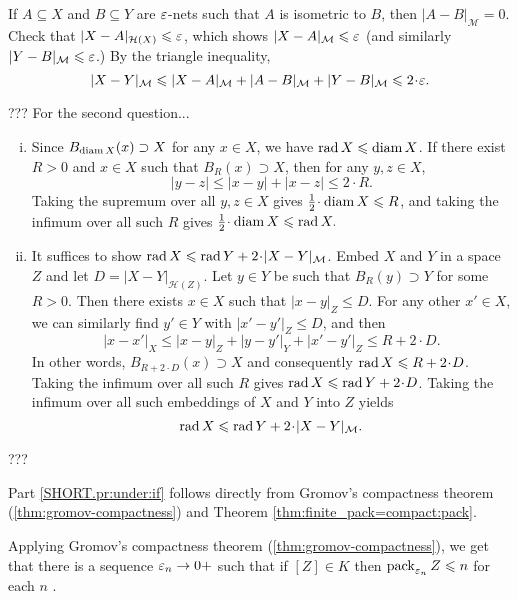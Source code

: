 If $A \subseteq X$ and $B \subseteq Y$ are $\varepsilon$-nets such that $A$ is isometric to $B$, then $|A - B|_{\mathcal{M}} = 0$.  Check that $|X - A|_{\mathcal{H}(X)} \leqslant \varepsilon$, which shows $|X - A|_{\mathcal{M}} \leqslant \varepsilon$ (and similarly $|Y - B|_{\mathcal{M}} \leqslant \varepsilon$.)  By the triangle inequality,
$$|X - Y|_{\mathcal{M}} \le |X - A|_{\mathcal{M}} + |A - B|_{\mathcal{M}} + |Y - B|_{\mathcal{M}} \le 2\cdot\eps.$$

??? For the second question...


\begin{enumerate}[(i)]
\item Since $B_{\operatorname{diam} X}(x) \supset X$ for any $x \in X$, we have $\mathop{\rm rad} X \leqslant \operatorname{diam} X$.  If there exist $R > 0$ and $x \in X$ such that $B_R(x) \supset X$, then for any $y, z \in X$,
$$|y - z| \le |x - y| + |x - z| \le 2\cdot R.$$  
Taking the supremum over all $y,z \in X$ gives $\tfrac12 \cdot \diam X \le R$, and taking the infimum over all such $R$ gives $\tfrac12 \cdot \diam X \le \rad X.$
\item It suffices to show 
$\rad X \le \rad Y + 2 \cdot |X - Y|_{\mathcal{M}}$.  
Embed $X$ and $Y$ in a space $Z$ and let $D = |X - Y|_{\mathcal{H}(Z)}$.  
Let $y \in Y$ be such that $B_R(y) \supset Y$ for some $R > 0$.  Then there exists $x \in X$ such that $|x - y|_Z \le D$.  
For any other $x' \in X$, we can similarly find $y' \in Y$ with $|x' - y'|_Z \le D$, and then
$$|x - x'|_X \le |x - y|_Z + |y - y'|_Y + |x' - y'|_Z \le R + 2\cdot D.$$
In other words, $B_{R + 2\cdot D}(x) \supset X$ and consequently $\rad X \le R + 2\cdot D$.  
Taking the infimum over all such $R$ gives $\rad X \le \rad Y + 2\cdot D$.  
Taking the infimum over all such embeddings of $X$ and $Y$ into $Z$ yields 
$$\rad X \leq \rad Y + 2\cdot |X - Y|_{\mathcal{M}}.$$
\end{enumerate}

???

Part \ref{SHORT.pr:under:if} follows directly from 
Gromov's compactness theorem (\ref{thm:gromov-compactness}) 
and Theorem \ref{thm:finite_pack=compact:pack}.

 Applying Gromov's compactness theorem (\ref{thm:gromov-compactness}), we get that there is a sequence $\varepsilon_n\to0+$ such that if $[Z]\in K$
then $\operatorname{pack}_{\varepsilon_n}Z\leqslant n$ for each $n$ .

